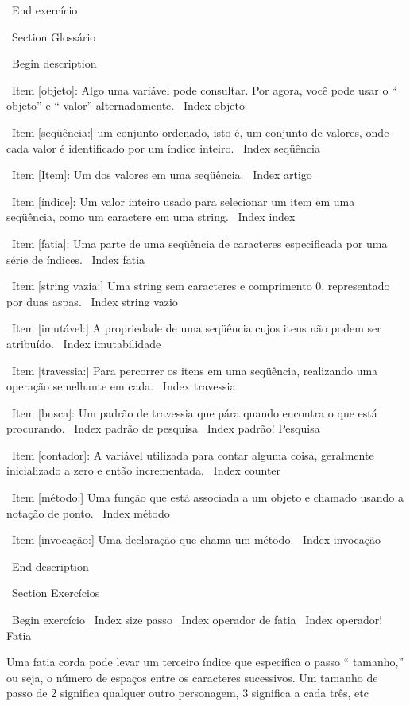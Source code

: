 \documentclass[10pt]{book}
\begin{document}
{{{{{{\ End {} exercício



\ Section {} Glossário

\ Begin {description}

\ Item [objeto]: Algo uma variável pode consultar. Por agora,
você pode usar o `` objeto'' e `` valor'' alternadamente.
\ Index {objeto}

\ Item [seqüência:] um conjunto ordenado, isto é, um conjunto de
valores, onde cada valor é identificado por um índice inteiro.
\ Index {seqüência}

\ Item [Item]: Um dos valores em uma seqüência.
\ Index {artigo}

\ Item [índice]: Um valor inteiro usado para selecionar um item em
uma seqüência, como um caractere em uma string.
\ Index {index}

\ Item [fatia]: Uma parte de uma seqüência de caracteres especificada por uma série de índices.
\ Index {fatia}

\ Item [string vazia:] Uma string sem caracteres e comprimento 0, representado
por duas aspas.
\ Index {string vazio}

\ Item [imutável:] A propriedade de uma seqüência cujos itens não podem
ser atribuído.
\ Index {imutabilidade}

\ Item [travessia:] Para percorrer os itens em uma seqüência,
realizando uma operação semelhante em cada.
\ Index {travessia}

\ Item [busca]: Um padrão de travessia que pára
quando encontra o que está procurando.
\ Index {padrão de pesquisa}
\ Index {padrão! Pesquisa}

\ Item [contador]: A variável utilizada para contar alguma coisa, geralmente inicializado
a zero e então incrementada.
\ Index {counter}

\ Item [método:] Uma função que está associada a um objeto e chamado
usando a notação de ponto.
\ Index {método}

\ Item [invocação:] Uma declaração que chama um método.
\ Index {} invocação

\ End {description}


\ Section {Exercícios}

\ Begin {} exercício
\ Index {size passo}
\ Index {operador de fatia}
\ Index {operador! Fatia}

Uma fatia corda pode levar um terceiro índice que especifica o passo ``
tamanho,'' ou seja, o número de espaços entre os caracteres sucessivos.
Um tamanho de passo de 2 significa qualquer outro personagem, 3 significa a cada três,
etc

}}}}}}
\end{document}
